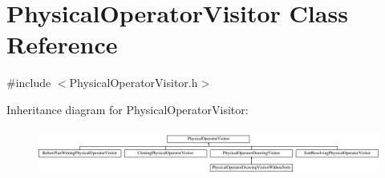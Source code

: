\hypertarget{class_physical_operator_visitor}{\section{Physical\+Operator\+Visitor Class Reference}
\label{class_physical_operator_visitor}
}


{\ttfamily \#include $<$Physical\+Operator\+Visitor.\+h$>$}

Inheritance diagram for Physical\+Operator\+Visitor\+:\begin{figure}[H]
\begin{center}
\leavevmode
\includegraphics[height=1.561338cm]{class_physical_operator_visitor}
\end{center}
\end{figure}
